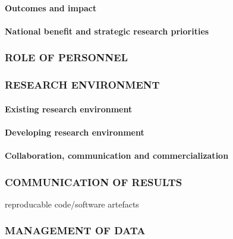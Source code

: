 \documentclass[a4paper]{scrartcl}
\begin{document}


\paragraph{Outcomes and impact}



\paragraph{National benefit and strategic research priorities}



\subsubsection*{ROLE OF PERSONNEL}



\subsubsection*{RESEARCH ENVIRONMENT}

\paragraph{Existing research environment}



\paragraph{Developing research environment}



\paragraph{Collaboration, communication and commercialization}



\subsubsection*{COMMUNICATION OF RESULTS}

reproducable code/software artefacts

\subsubsection*{MANAGEMENT OF DATA}
\end{document}
